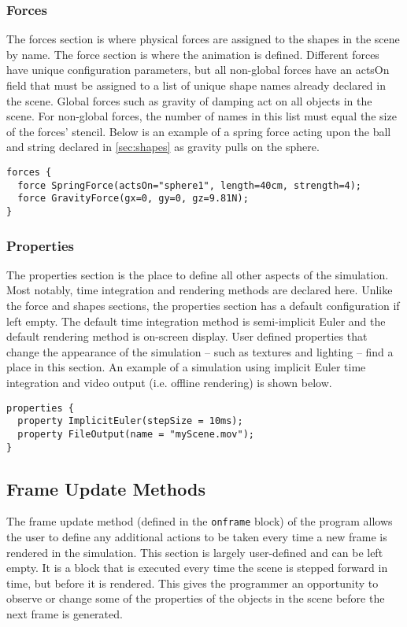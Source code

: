 \documentclass[letterpaper]{article}
\begin{document}
\subsubsection{Forces}

The forces section is where physical forces are assigned to the shapes
in the scene by name. The force section is where the animation is
defined. Different forces have unique configuration parameters, but
all non-global forces have an actsOn field that must be assigned to a
list of unique shape names already declared in the scene. Global
forces such as gravity of damping act on all objects in the scene. For
non-global forces, the number of names in this list must equal the
size of the forces' stencil. Below is an example of a spring force
acting upon the ball and string declared in \ref{sec:shapes} as
gravity pulls on the sphere.

\begin{verbatim}
forces {
  force SpringForce(actsOn="sphere1", length=40cm, strength=4);
  force GravityForce(gx=0, gy=0, gz=9.81N);
}
\end{verbatim}
 
\subsubsection{Properties}

The properties section is the place to define all other aspects of the
simulation. Most notably, time integration and rendering methods are
declared here. Unlike the force and shapes sections, the properties
section has a default configuration if left empty. The default time
integration method is semi-implicit Euler and the default rendering
method is on-screen display. User defined properties that change the
appearance of the simulation -- such as textures and lighting -- find a
place in this section. An example of a simulation using implicit Euler
time integration and video output (i.e. offline rendering) is shown
below.

\begin{verbatim}
properties {
  property ImplicitEuler(stepSize = 10ms);
  property FileOutput(name = "myScene.mov");
}
\end{verbatim}
 
\subsection{Frame Update Methods}
The frame update method (defined in the \texttt{onframe} block) of the
program allows the user to define any additional actions to be taken
every time a new frame is rendered in the simulation. This section is
largely user-defined and can be left empty. It is a block that is
executed every time the scene is stepped forward in time, but before
it is rendered. This gives the programmer an opportunity to observe or
change some of the properties of the objects in the scene before the
next frame is generated.
\end{document}
